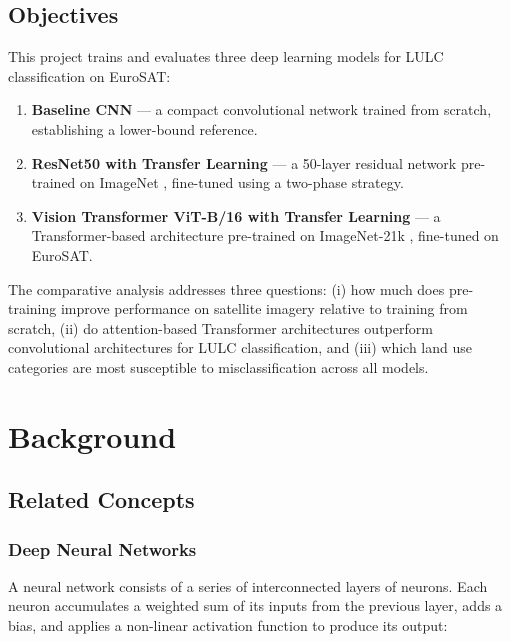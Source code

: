 \documentclass[12pt, letterpaper]{article}
\begin{document}
\subsection{Objectives}

This project trains and evaluates three deep learning models for LULC classification
on EuroSAT:

\begin{enumerate}
    \item \textbf{Baseline CNN} --- a compact convolutional network trained from
          scratch, establishing a lower-bound reference.
    \item \textbf{ResNet50 with Transfer Learning} --- a 50-layer residual network
          pre-trained on ImageNet \cite{he2016resnet}, fine-tuned using a two-phase
          strategy.
    \item \textbf{Vision Transformer ViT-B/16 with Transfer Learning} --- a
          Transformer-based architecture pre-trained on ImageNet-21k
          \cite{dosovitskiy2021vit}, fine-tuned on EuroSAT.
\end{enumerate}

The comparative analysis addresses three questions: (i) how much does pre-training
improve performance on satellite imagery relative to training from scratch, (ii) do
attention-based Transformer architectures outperform convolutional architectures for
LULC classification, and (iii) which land use categories are most susceptible to
misclassification across all models.

\section{Background}

\subsection{Related Concepts}

\subsubsection{Deep Neural Networks}

A neural network consists of a series of interconnected layers of neurons. Each neuron
accumulates a weighted sum of its inputs from the previous layer, adds a bias, and
applies a non-linear activation function to produce its output:
\end{document}
